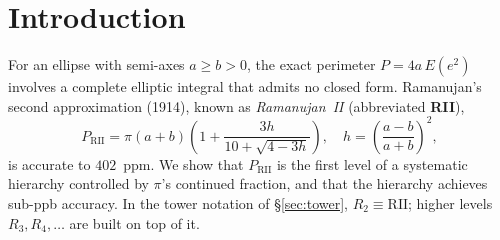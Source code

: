 \documentclass[12pt]{article}
\begin{document}
\begin{abstract}
\medskip
\noindent\textbf{Methodology.}
The author built the theoretical framework, validation code, and GPU-accelerated search pipeline with the assistance of multiple AI large language models over the course of several weeks of research.  Research computers included a Linux server with 5$\times$ NVIDIA RTX 4090 (256~GB RAM), a Mac Studio M2 Ultra (192~GB), and a MacBook Pro M2 Max (96~GB), all of which ran hundreds of computational, proof-solving, and LLM workloads over the course of investigation.  Open-weight models running locally included Z.ai GLM-4.7, Qwen3 Coder Next, Qwen3.5 122B, and Qwen3 VL.  Closed-weight models included ChatGPT 5.2-5.4, Claude Opus 4.6, Claude Sonnet 4.6, and Gemini 3.1.  The continued fraction analysis presented here was also used to prove several open conjectures related to the continued fractions of $\pi$ that had been listed on the Ramanujan Machine project for several years.

\end{abstract}

\tableofcontents
\newpage

\section{Introduction}\label{sec:intro}

For an ellipse with semi-axes $a \ge b > 0$, the exact perimeter
$P = 4a\,E(e^2)$ involves a complete elliptic integral that
admits no closed form. Ramanujan's second approximation (1914), known as \emph{Ramanujan~II} (abbreviated \textbf{RII}),
\begin{equation}\label{eq:R2}
P_{\text{RII}} = \pi(a+b)\!\left(1 + \frac{3h}{10+\sqrt{4-3h}}\right),
\quad h = \left(\frac{a-b}{a+b}\right)^{\!2},
\end{equation}
is accurate to $402$~ppm. We show that $P_{\text{RII}}$ is the first level of a systematic hierarchy controlled by $\pi$'s continued fraction, and that the hierarchy achieves sub-ppb accuracy. In the tower notation of \S\ref{sec:tower}, $R_2 \equiv \text{RII}$; higher levels $R_3, R_4, \ldots$ are built on top of it.
\end{document}
